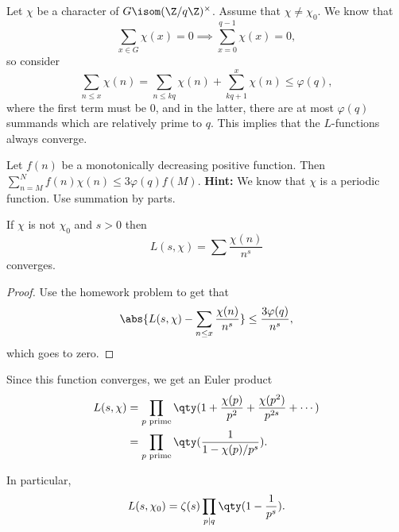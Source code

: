 Let $\chi$ be a character of $G \isom (\Z/q\Z)^\times$.
Assume that $\chi \not= \chi_0$.
We know that 
\[ 
	\sum_{x\in G} \chi(x) = 0 \implies \sum_{x=0}^{q-1} \chi(x) = 0, \tag{by orthogonality}
\]
so consider 
\[ 
	\sum_{n \leq x} \chi(n) = \sum_{n \leq kq} \chi(n) + \sum_{kq+1}^x \chi(n)
	\leq \varphi(q),	
\]
where the first term must be $0$, and in the latter, there are at most 
$\varphi(q)$ summands which are relatively prime to $q$.
This implies that the $L$-functions always converge.

\begin{problem}[Homework]
	Let $f(n)$ be a monotonically decreasing positive function. 
	Then $\sum_{n =M}^N f(n)\chi(n) \leq 3\varphi(q)f(M)$.
	\textbf{Hint:} We know that $\chi$ is a periodic function.
	Use summation by parts.
\end{problem}

\begin{corollary}
	If $\chi$ is not $\chi_0$ and $s > 0$ then 
	\[ L(s,\chi) = \sum \frac{\chi(n)}{n^s} \]
	converges.
\end{corollary}

\begin{proof}
	Use the homework problem to get that 
	\[ \abs{L(s,\chi) - \sum_{n \leq x} \frac{\chi(n)}{n^s}} \leq \frac{3\varphi(q)}{n^s}, \]
	which goes to zero.
\end{proof}

Since this function converges, we get an Euler product
\begin{align*}
	L(s, \chi) &= \prod_{\text{$p$ prime}} \qty(1 + \frac{\chi(p)}{p^2} + \frac{\chi(p^2)}{p^{2s}} + \cdots) \\
	&= \prod_{\text{$p$ prime}} \qty(\frac{1}{1-\chi(p)/p^s}).
\end{align*}

In particular, 
\[ L(s,\chi_0) = \zeta(s)\prod_{p \mid q}\qty(1-\frac{1}{p^s}). \]